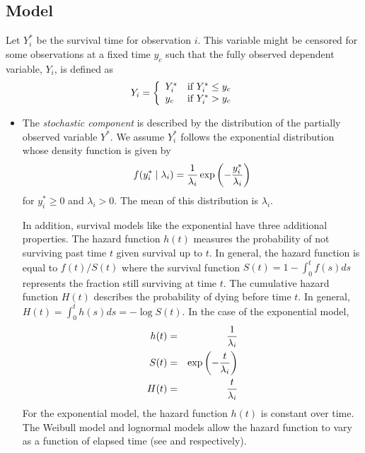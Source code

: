 \documentclass[letterpaper,10pt,english]{sphinxmanual}
\begin{document}
\subsection{Model}
\label{vignette:model}
Let \(Y_i^*\) be the survival time for observation \(i\). This
variable might be censored for some observations at a fixed time
\(y_c\) such that the fully observed dependent variable,
\(Y_i\), is defined as
\begin{gather}
\begin{split}Y_i = \left\{ \begin{array}{ll}
      Y_i^* & \textrm{if }Y_i^* \leq y_c \\
      y_c & \textrm{if }Y_i^* > y_c \\
    \end{array} \right.\end{split}\notag
\end{gather}\begin{itemize}
\item {} 
The \emph{stochastic component} is described by the distribution of the
partially observed variable \(Y^*\). We assume \(Y_i^*\)
follows the exponential distribution whose density function is given
by
\begin{gather}
\begin{split}f(y_i^*\mid \lambda_i) = \frac{1}{\lambda_i} \exp\left(-\frac{y_i^*}{\lambda_i}\right)\end{split}\notag
\end{gather}
for \(y_i^*\ge 0\) and \(\lambda_i>0\). The mean of this
distribution is \(\lambda_i\).

In addition, survival models like the exponential have three
additional properties. The hazard function \(h(t)\) measures the
probability of not surviving past time \(t\) given survival up to
\(t\). In general, the hazard function is equal to
\(f(t)/S(t)\) where the survival function
\(S(t) = 1 - \int_{0}^t f(s) ds\) represents the fraction still
surviving at time \(t\). The cumulative hazard function
\(H(t)\) describes the probability of dying before time
\(t\). In general,
\(H(t)= \int_{0}^{t} h(s) ds = -\log S(t)\). In the case of the
exponential model,
\begin{gather}
\begin{split}\begin{aligned}
h(t) &=& \frac{1}{\lambda_i} \\
S(t) &=& \exp\left( -\frac{t}{\lambda_i} \right) \\
H(t) &=& \frac{t}{\lambda_i}\end{aligned}\end{split}\notag
\end{gather}
For the exponential model, the hazard function \(h(t)\) is
constant over time. The Weibull model and lognormal models allow the
hazard function to vary as a function of elapsed time (see and
respectively).


\end{itemize}
\end{document}
